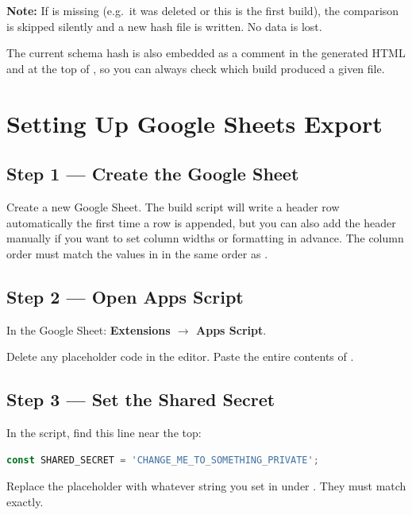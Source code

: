 \begin{notebox}
\textbf{Note:} If  is missing (e.g.\ it was deleted or
this is the first build), the comparison is skipped silently and a new hash
file is written. No data is lost.
\end{notebox}

The current schema hash is also embedded as a comment in the generated HTML
and at the top of , so you can always check which build
produced a given file.

\chapter{Setting Up Google Sheets Export}

\section{Step 1 --- Create the Google Sheet}

Create a new Google Sheet. The build script will write a header row
automatically the first time a row is appended, but you can also add the
header manually if you want to set column widths or formatting in advance. The
column order must match the  values in 
in the same order as .

\section{Step 2 --- Open Apps Script}

In the Google Sheet: \textbf{Extensions $\to$ Apps Script}.

Delete any placeholder code in the editor. Paste the entire contents of
.

\section{Step 3 --- Set the Shared Secret}

In the script, find this line near the top:

\begin{lstlisting}[language=javascript]
const SHARED_SECRET = 'CHANGE_ME_TO_SOMETHING_PRIVATE';
\end{lstlisting}

Replace the placeholder with whatever string you set in 
under . They must match exactly.

